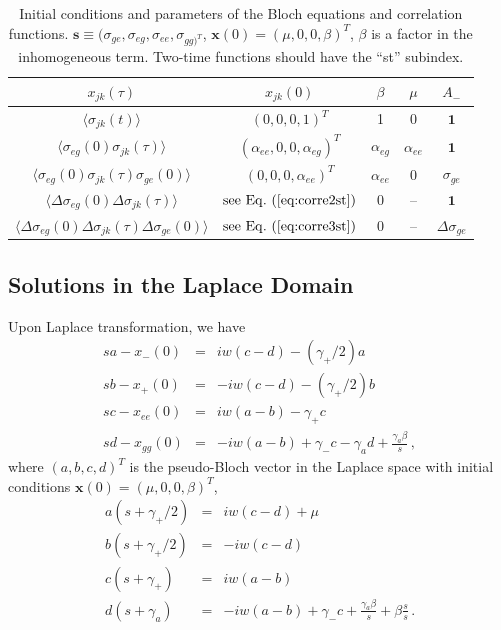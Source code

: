 \documentclass[twocolumn,aps,eqsecnum,showkeys,amsmath]{revtex4-2}
\begin{document}
% 
\begin{table}[t]
\caption{Initial conditions and parameters of the Bloch equations and 
correlation functions. 
$\mathbf{s} \equiv (\sigma_{ge}, \sigma_{eg}, \sigma_{ee}, \sigma_{gg)^T}$, 
$\mathbf{x}(0) = ( \mu,0,0,\beta)^T$, $\beta$ is a factor in the 
inhomogeneous term. Two-time functions should have the ``st'' subindex.} 
\begin{ruledtabular}
\begin{tabular}{ccccc} 		%
$x_{jk} (\tau)$ & $x_{jk}(0)$ & $\beta$ & $\mu$ & $A_-$ \\ \hline
%
$\langle \sigma_{jk} (t) \rangle$  & $(0,0,0,1)^T$ & 1 & 0 & $\mathbf{1}$	\\ 
%
$\langle \sigma_{eg}(0) \sigma_{jk}(\tau) \rangle$ & 
	$(\alpha_{ee},0,0,\alpha_{eg})^T$  & $\alpha_{eg}$ & $\alpha_{ee}$ & 
	$\mathbf{1}$ 	\\ 
%
$\langle \sigma_{eg}(0) \sigma_{jk}(\tau) \sigma_{ge}(0) \rangle$ 
	 & $(0,0,0,\alpha_{ee})^T$ & $\alpha_{ee}$ & 0  & $\sigma_{ge}$    \\  
%
$\langle \Delta \sigma_{eg}(0) \Delta \sigma_{jk}(\tau) \rangle$ 
	&  $\mathrm{see \,\,Eq.}~(\ref{eq:corre2st})$ & 0 & -- & $\mathbf{1}$  \\ 
%
$\langle \Delta \sigma_{eg}(0) \Delta \sigma_{jk}(\tau) \Delta \sigma_{ge} (0) \rangle$  
	&  $\mathrm{see \,\,Eq.}~(\ref{eq:corre3st})$ & 0 & -- & 
	$\Delta \sigma_{ge}$ 		
\label{default}
\end{tabular}	
\end{ruledtabular}
\end{table}

\subsection{Solutions in the Laplace Domain} %
Upon Laplace transformation, we have 
%
\begin{eqnarray*} 	
s a - x_-(0) &=& i w (c -d) -(\gamma_+/2) a 	\\ 
s b - x_+(0) &=& -i w (c -d) -(\gamma_+/2) b 	\\ 
s c - x_{ee}(0) &=& i w (a-b) -\gamma_+ c 		\\ 
s d - x_{gg}(0) &=& -i w (a-b) +\gamma_- c -\gamma_a d 
	+\frac{\gamma_a \beta}{s} \,,
\end{eqnarray*} 
where $(a,b,c,d)^T$ is the pseudo-Bloch vector in the Laplace space 
with initial conditions $\mathbf{x}(0) = ( \mu,0,0,\beta)^T$,  
%
\begin{eqnarray*} 	
a (s +\gamma_+/2) &=& i w (c -d)  +\mu 	\\ 
b (s +\gamma_+/2) &=& -i w (c -d)  	\\ 
c (s +\gamma_+) &=& i w (a-b)  		\\ 
d (s +\gamma_a)  &=& -i w (a-b) +\gamma_- c  
	+\frac{\gamma_a \beta}{s} + \beta \frac{s}{s} \,.
\end{eqnarray*} 
\end{document}
